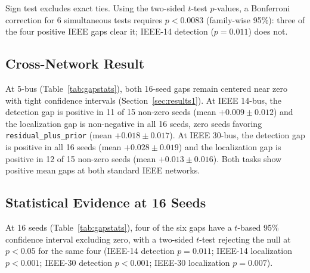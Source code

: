 \documentclass[conference]{IEEEtran}
\begin{document}
\begin{table}[t]
\centering
\caption{\texttt{topology\_fusion} vs.\ \texttt{residual\_plus\_prior} (IEEE-14/30: the strongest non-relational baseline in every seed), 16 independent seeds (500 repl.\ each), all three networks}
\label{tab:gapstats}
\footnotesize
{}

\smallskip
\footnotesize Sign test excludes exact ties. Using the two-sided $t$-test $p$-values, a Bonferroni correction for 6 simultaneous tests requires $p<0.0083$ (family-wise 95\%): three of the four positive IEEE gaps clear it; IEEE-14 detection ($p=0.011$) does not.
\end{table}

\subsection{Cross-Network Result}
At 5-bus (Table~\ref{tab:gapstats}), both 16-seed gaps remain centered near zero with tight confidence intervals (Section~\ref{sec:results1}). At IEEE 14-bus, the detection gap is positive in 11 of 15 non-zero seeds (mean $+0.009\pm0.012$) and the localization gap is non-negative in all 16 seeds, zero seeds favoring \texttt{residual\_plus\_prior} (mean $+0.018\pm0.017$). At IEEE 30-bus, the detection gap is positive in all 16 seeds (mean $+0.028\pm0.019$) and the localization gap is positive in 12 of 15 non-zero seeds (mean $+0.013\pm0.016$). Both tasks show positive mean gaps at both standard IEEE networks.

\subsection{Statistical Evidence at 16 Seeds}
\label{sec:scale-stats}
At 16 seeds (Table~\ref{tab:gapstats}), four of the six gaps have a $t$-based 95\% confidence interval excluding zero, with a two-sided $t$-test rejecting the null at $p<0.05$ for the same four (IEEE-14 detection $p=0.011$; IEEE-14 localization $p<0.001$; IEEE-30 detection $p<0.001$; IEEE-30 localization $p=0.007$). 
\end{document}
